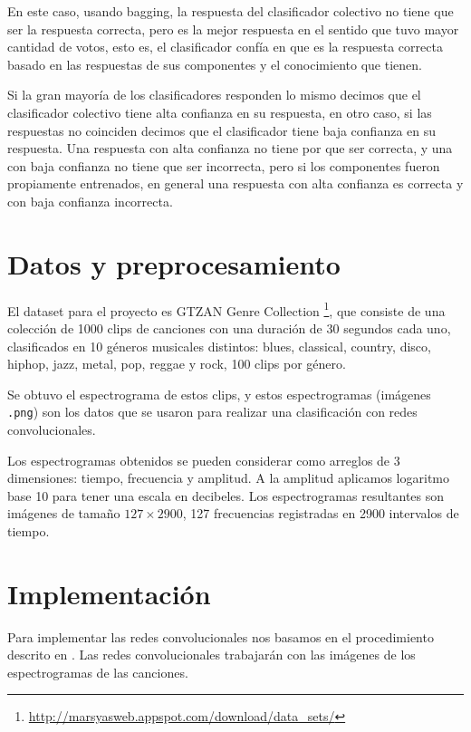 \documentclass[spanish,11pt,letterpaper]{article}
\begin{document}
En este caso, usando bagging, la respuesta del clasificador colectivo no tiene
que ser la respuesta correcta, pero es la mejor respuesta en el sentido que
tuvo mayor cantidad de votos, esto es, el clasificador confía en que es la
respuesta correcta basado en las respuestas de sus componentes y el conocimiento
que tienen.

Si la gran mayoría de los clasificadores responden lo mismo decimos que el clasificador
colectivo tiene alta confianza en su respuesta, en otro caso, si las respuestas
no coinciden decimos que el clasificador tiene baja confianza en su respuesta.
Una respuesta con alta confianza no tiene por que ser correcta, y una con baja
confianza no tiene que ser incorrecta, pero si los componentes fueron propiamente
entrenados, en general una respuesta con alta confianza es correcta y con baja
confianza incorrecta\cite{scholarpedia}.

\section{Datos y preprocesamiento}

El dataset para el proyecto es \textsf{GTZAN Genre Collection}%
\footnote{\url{http://marsyasweb.appspot.com/download/data_sets/}}, que consiste de
una colección de 1000 clips de canciones con una duración de 30 segundos cada uno,
clasificados en 10 géneros musicales distintos: blues, classical, country, disco,
hiphop, jazz, metal, pop, reggae y rock, 100 clips por género.

Se obtuvo el espectrograma de estos clips, y estos espectrogramas (imágenes
\texttt{.png}) son los datos que se usaron para realizar una clasificación con
redes convolucionales.

Los espectrogramas obtenidos se pueden considerar como arreglos de 3 dimensiones: tiempo, frecuencia
y amplitud. A la amplitud aplicamos logaritmo base 10 para tener una escala en
decibeles. Los espectrogramas resultantes son imágenes de tamaño $127 \times 2900$,
127 frecuencias registradas en 2900 intervalos de tiempo.

\section{Implementación}

Para implementar las redes convolucionales nos basamos en el procedimiento descrito
en \cite{audio_recognition}. Las redes convolucionales trabajarán con las
imágenes de los espectrogramas de las canciones.
\end{document}
